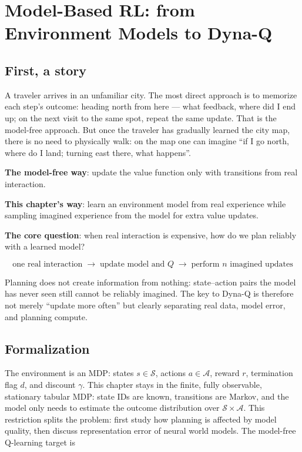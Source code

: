 \documentclass{article}
\begin{document}
\section*{Model-Based RL: from Environment Models to Dyna-Q}

\subsection*{First, a story}

A traveler arrives in an unfamiliar city. The most direct approach is to memorize each step's outcome: heading north from here --- what feedback, where did I end up; on the next visit to the same spot, repeat the same update. That is the model-free approach. But once the traveler has gradually learned the city map, there is no need to physically walk: on the map one can imagine ``if I go north, where do I land; turning east there, what happens''.

\textbf{The model-free way}: update the value function only with transitions from real interaction.

\textbf{This chapter's way}: learn an environment model from real experience while sampling imagined experience from the model for extra value updates.

\textbf{The core question}: when real interaction is expensive, how do we plan reliably with a learned model?

\[
\boxed{\text{one real interaction} \;\longrightarrow\; \text{update model and }Q \;\longrightarrow\; \text{perform }n\text{ imagined updates}}
\]

Planning does not create information from nothing: state--action pairs the model has never seen still cannot be reliably imagined. The key to Dyna-Q is therefore not merely ``update more often'' but clearly separating real data, model error, and planning compute.

\subsection*{Formalization}

The environment is an MDP: states $s\in\mathcal S$, actions $a\in\mathcal A$, reward $r$, termination flag $d$, and discount $\gamma$. This chapter stays in the finite, fully observable, stationary tabular MDP: state IDs are known, transitions are Markov, and the model only needs to estimate the outcome distribution over $\mathcal S\times\mathcal A$. This restriction splits the problem: first study how planning is affected by model quality, then discuss representation error of neural world models. The model-free Q-learning target is
\end{document}

